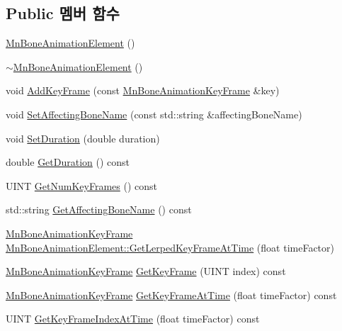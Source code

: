 \subsection*{Public 멤버 함수}
\begin{DoxyCompactItemize}
\item 
\hyperlink{class_m_n_l_1_1_mn_bone_animation_element_a17a71367d88886a9a1a06ce72cc3ae3f}{Mn\+Bone\+Animation\+Element} ()
\item 
\hyperlink{class_m_n_l_1_1_mn_bone_animation_element_a485d435a1d1a7ba730721c06ebfa0df5}{$\sim$\+Mn\+Bone\+Animation\+Element} ()
\item 
void \hyperlink{class_m_n_l_1_1_mn_bone_animation_element_a3c4b8bf56a5c5ebf5d6045ae93e5b808}{Add\+Key\+Frame} (const \hyperlink{struct_m_n_l_1_1_mn_bone_animation_key_frame}{Mn\+Bone\+Animation\+Key\+Frame} \&key)
\item 
void \hyperlink{class_m_n_l_1_1_mn_bone_animation_element_a9e9864a75d577193b3e39ce56838c43c}{Set\+Affecting\+Bone\+Name} (const std\+::string \&affecting\+Bone\+Name)
\item 
void \hyperlink{class_m_n_l_1_1_mn_bone_animation_element_a2f9f402279191cf7009e8b47bf3f3311}{Set\+Duration} (double duration)
\item 
double \hyperlink{class_m_n_l_1_1_mn_bone_animation_element_ad489dc7c72dea26d157a205d6af4fadb}{Get\+Duration} () const
\item 
U\+I\+NT \hyperlink{class_m_n_l_1_1_mn_bone_animation_element_ac92bc52d44e187e00af032d5faa5c735}{Get\+Num\+Key\+Frames} () const
\item 
std\+::string \hyperlink{class_m_n_l_1_1_mn_bone_animation_element_a7461a3a8bf2078d394db3a86c3a5eda6}{Get\+Affecting\+Bone\+Name} () const
\item 
\hyperlink{struct_m_n_l_1_1_mn_bone_animation_key_frame}{Mn\+Bone\+Animation\+Key\+Frame} \hyperlink{class_m_n_l_1_1_mn_bone_animation_element_ab689fa5a0df4c1d6a601baa13759d10d}{Mn\+Bone\+Animation\+Element\+::\+Get\+Lerped\+Key\+Frame\+At\+Time} (float time\+Factor)
\item 
\hyperlink{struct_m_n_l_1_1_mn_bone_animation_key_frame}{Mn\+Bone\+Animation\+Key\+Frame} \hyperlink{class_m_n_l_1_1_mn_bone_animation_element_a8cd10f7f60f232471e6ce603cdbf76ea}{Get\+Key\+Frame} (U\+I\+NT index) const
\item 
\hyperlink{struct_m_n_l_1_1_mn_bone_animation_key_frame}{Mn\+Bone\+Animation\+Key\+Frame} \hyperlink{class_m_n_l_1_1_mn_bone_animation_element_a58874b3fe81886f1c13ca6f77b4a171c}{Get\+Key\+Frame\+At\+Time} (float time\+Factor) const
\item 
U\+I\+NT \hyperlink{class_m_n_l_1_1_mn_bone_animation_element_ad22dfccb49a16ee30ab83c2ca0ca3185}{Get\+Key\+Frame\+Index\+At\+Time} (float time\+Factor) const
\end{DoxyCompactItemize}
